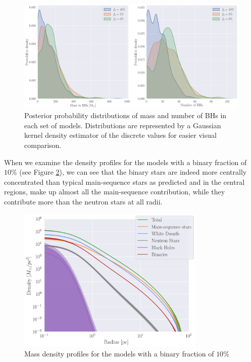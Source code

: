 \begin{figure}
	\centering
	\includegraphics[width=\textwidth]{figures/BH_KDEs.png}
	\caption{Posterior probability distributions of mass and number of BHs in each set of models.
		Distributions are represented by a Gaussian kernel density estimator of the discrete values
		for easier visual comparison.}
	\label{fig:BH_KDEs}
\end{figure}

When we examine the density profiles for the models with a binary fraction of $10\%$ (see Figure
\ref{fig:highbin_model_densities}), we can see that the binary stars are indeed more centrally
concentrated than typical main-sequence stars as predicted and in the central regions, make up
almost all the main-sequence contribution, while they contribute more than the neutron stars at all
radii.



\begin{figure}
	\centering
	\includegraphics[width=0.8\textwidth]{figures/high_bin_model/density.png}
	\caption{Mass density profiles for the models with a binary fraction of $10\%$}
	\label{fig:highbin_model_densities}
\end{figure}

